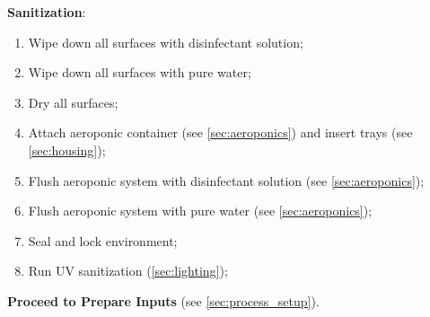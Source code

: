 \textbf{Sanitization}:
\begin{enumerate}
    \item Wipe down all surfaces with disinfectant solution;
    \item Wipe down all surfaces with pure water;
    \item Dry all surfaces;
    \item Attach aeroponic container (see \ref{sec:aeroponics}) and insert trays (see \ref{sec:housing});
    \item Flush aeroponic system with disinfectant solution (see \ref{sec:aeroponics});
    \item Flush aeroponic system with pure water (see \ref{sec:aeroponics});
    \item Seal and lock environment;
    \item Run UV sanitization (\ref{sec:lighting});
\end{enumerate}

\textbf{Proceed to Prepare Inputs} (see \ref{sec:process_setup}).